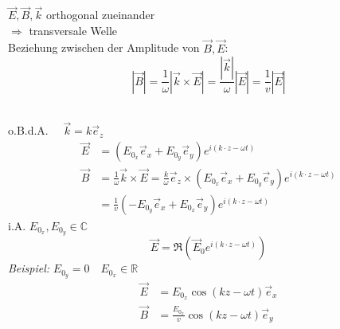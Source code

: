 \begin{minipage}{.5\linewidth}
	$ \vec{E}, \vec{B}, \vec{k} $ orthogonal zueinander\\
	$ \Rightarrow $ transversale Welle\\
	Beziehung zwischen der Amplitude von $ \vec{B}, \vec{E} $:
	\begin{equation*}
	|\vec{B}| = \frac{1}{\omega} |\vec{k} \times \vec{E}| = \frac{|\vec{k}|}{\omega} |\vec{E}| = \frac{1}{v} |\vec{E}|
	\end{equation*}
\end{minipage}%
\begin{minipage}{.5\linewidth}
	\flushright
\end{minipage}%
\\
o.B.d.A. $ \quad \vec{k} = k \vec{e}_z $
\begin{align*}
\vec{E} &= (E_{0_x} \vec{e}_x + E_{0_y} \vec{e}_y) e^{i(k \cdot z - \omega t)} \\
\vec{B} &= \frac{1}{\omega} \vec{k} \times \vec{E} = \frac{k}{\omega} \vec{e}_z \times (E_{0_x} \vec{e}_x + E_{0_y} \vec{e}_y) e^{i(k \cdot z - \omega t)} \\
&= \frac{1}{v} (- E_{0_y} \vec{e}_x + E_{0_x} \vec{e}_y) e^{i(k \cdot z - \omega t)} 
\end{align*}
i.A. $ E_{0_x}, E_{0_y} \in \mathbb{C} $
\begin{equation*}
\vec{E} = \Re\left(\vec{E}_0 e^{i(k \cdot z - \omega t)} \right)
\end{equation*}
\emph{Beispiel:} $ E_{0_y} = 0 \quad E_{0_x} \in \mathbb{R} $
\begin{align*}
\vec{E} &= E_{0_x} \cos (kz - \omega t) \vec{e}_x \\
\vec{B} &= \frac{E_{0_x}}{v} \cos(kz - \omega t) \vec{e}_y
\end{align*}

